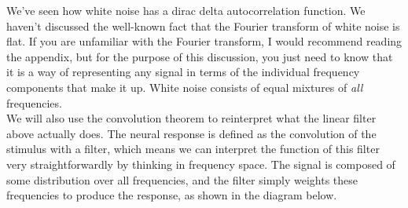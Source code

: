 \documentclass{article}
\begin{document}
We've seen how white noise has a dirac delta autocorrelation function. We haven't discussed the well-known fact that the Fourier transform of white noise is flat. If you are unfamiliar with the Fourier transform, I would recommend reading the appendix, but for the purpose of this discussion, you just need to know that it is a way of representing any signal in terms of the individual frequency components that make it up. White noise consists of equal mixtures of \textit{all} frequencies.\\

We will also use the convolution theorem to reinterpret what the linear filter above actually does. The neural response is defined as the convolution of the stimulus with a filter, which means we can interpret the function of this filter very straightforwardly by thinking in frequency space. The signal is composed of some distribution over all frequencies, and the filter simply weights these frequencies to produce the response, as shown in the diagram below.
\end{document}
